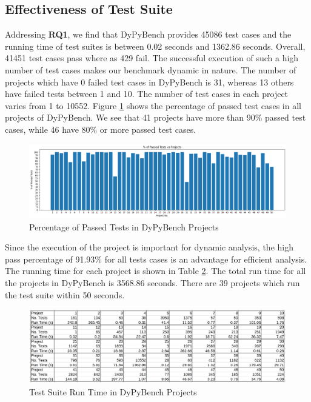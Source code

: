 \subsection{Effectiveness of Test Suite}
Addressing \textbf{RQ1}, we find that DyPyBench provides 45086 test cases and the running time of test suites is between 0.02 seconds and 1362.86 seconds.
Overall, 41451 test cases pass where as 429 fail.
The successful execution of such a high number of test cases makes our benchmark dynamic in nature.
The number of projects which have 0 failed test cases in DyPyBench is 31, whereas 13 others have failed tests between 1 and 10.
The number of test cases in each project varies from 1 to 10552.
Figure \ref{fig:successful_tests} shows the percentage of passed test cases in all projects of DyPyBench.
We see that 41 projects have more than 90\% passed test cases, while 46 have 80\% or more passed test cases.
\begin{figure}[ht]
    \centering
    \includegraphics[width=1\linewidth]{figures/evaluation/perc_passed_tests.png}
    \caption[Passed Test Case Percentage]{\label{fig:successful_tests}Percentage of Passed Tests in DyPyBench Projects}
\end{figure}

Since the execution of the project is important for dynamic analysis, the high pass percentage of 91.93\% for all tests cases is an advantage for efficient analysis.
The running time for each project is shown in Table \ref{fig:test_run_times}.
The total run time for all the projects in DyPyBench is 3568.86 seconds.
There are 39 projects which run the test suite within 50 seconds.
\begin{figure}[ht]
    \centering
    \includegraphics[width=1\linewidth]{figures/evaluation/tests_runtime2.png}
    \caption[Test Suite Run Time]{\label{fig:test_run_times}Test Suite Run Time in DyPyBench Projects}
\end{figure}

